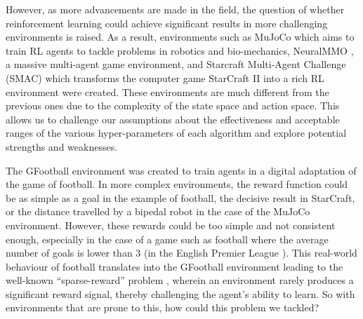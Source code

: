 \documentclass[11pt]{article}
\begin{document}
However, as more advancements are made in the field, the question of whether reinforcement learning could achieve significant results in more challenging environments is raised. As a result, environments such as MuJoCo \cite{MuJoCo} which aims to train RL agents to tackle problems in robotics and bio-mechanics, NeuralMMO \cite{suarez2019neural}, a massive multi-agent game environment, and Starcraft Multi-Agent Challenge (SMAC) \cite{samvelyan2019starcraft} which transforms the computer game StarCraft II into a rich RL environment were created. These environments are much different from the previous ones due to the complexity of the state space and action space. This allows us to challenge our assumptions about the effectiveness and acceptable ranges of the various hyper-parameters of each algorithm and explore potential strengths and weaknesses.

The GFootball environment was created to train agents in a digital adaptation of the game of football. In more complex environments, the reward function could be as simple as a goal in the example of football, the decisive result in StarCraft, or the distance travelled by a bipedal robot in the case of the MuJoCo environment.
However, these rewards could be too simple and not consistent enough, especially in the case of a game such as football where the average number of goals is lower than 3 (in the English Premier League \cite{eplgoals2021}). This real-world behaviour of football translates into the GFootball environment leading to the well-known “sparse-reward” problem , wherein an environment rarely produces a significant reward signal, thereby challenging the agent’s ability to learn. So with environments that are prone to this, how could this problem we tackled?
\end{document}
